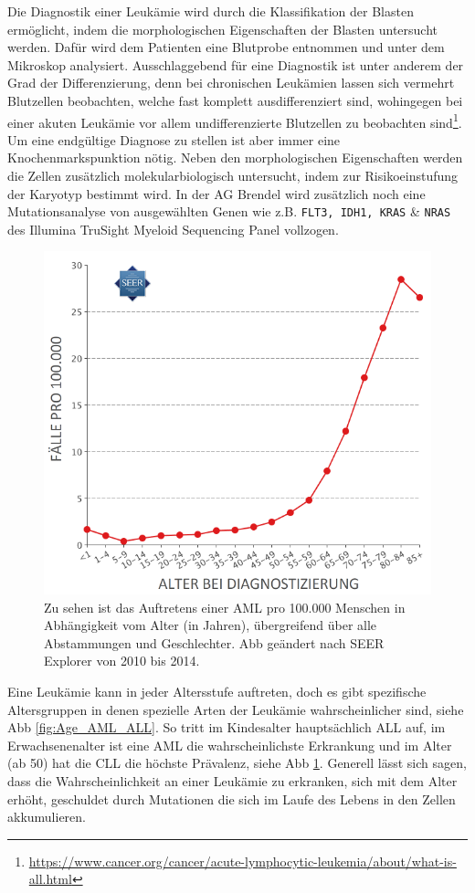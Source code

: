 Die Diagnostik einer Leukämie wird durch die Klassifikation der Blasten ermöglicht, indem die morphologischen Eigenschaften der Blasten untersucht werden. Dafür wird dem Patienten eine Blutprobe entnommen und unter dem Mikroskop analysiert. Ausschlaggebend für eine Diagnostik ist unter anderem der Grad der Differenzierung, denn bei chronischen Leukämien lassen sich vermehrt Blutzellen beobachten, welche fast komplett ausdifferenziert sind, wohingegen bei einer akuten Leukämie vor allem undifferenzierte Blutzellen zu beobachten sind\footnote{\url{https://www.cancer.org/cancer/acute-lymphocytic-leukemia/about/what-is-all.html}}. Um eine endgültige Diagnose zu stellen ist aber immer eine Knochenmarkspunktion nötig. Neben den morphologischen Eigenschaften werden die Zellen zusätzlich molekularbiologisch untersucht, indem zur Risikoeinstufung der Karyotyp bestimmt wird. In der AG Brendel wird zusätzlich noch eine Mutationsanalyse von ausgewählten Genen wie z.B. \texttt{FLT3, IDH1, KRAS} \& \texttt{NRAS} des Illumina TruSight Myeloid Sequencing Panel vollzogen.

\begin{figure}
\centering
\includegraphics[width=.90\textwidth]{images/Alter_AML_2014.png}
\caption{Zu sehen ist das Auftretens einer \ac{AML} pro 100.000 Menschen in Abhängigkeit vom Alter (in Jahren), übergreifend über alle Abstammungen und Geschlechter. \ac{Abb} geändert nach SEER\cite{Howlader.2014} Explorer\protect\footnotemark{} von 2010 bis 2014.}
\label{fig:Alter_AML}
\end{figure}
Eine Leukämie kann in jeder Altersstufe auftreten, doch es gibt spezifische Altersgruppen in denen spezielle Arten der Leukämie wahrscheinlicher sind, siehe \ac{Abb} \ref{fig:Age_AML_ALL}. So tritt im Kindesalter hauptsächlich \ac{ALL} auf\cite{Rubnitz.2012}, im Erwachsenenalter ist eine \ac{AML} die wahrscheinlichste Erkrankung und im Alter (ab 50) hat die \ac{CLL} die höchste Prävalenz, siehe \ac{Abb} \ref{fig:Alter_AML}. Generell lässt sich sagen, dass die Wahrscheinlichkeit an einer Leukämie zu erkranken, sich mit dem Alter erhöht, geschuldet durch Mutationen die sich im Laufe des Lebens in den Zellen akkumulieren.

